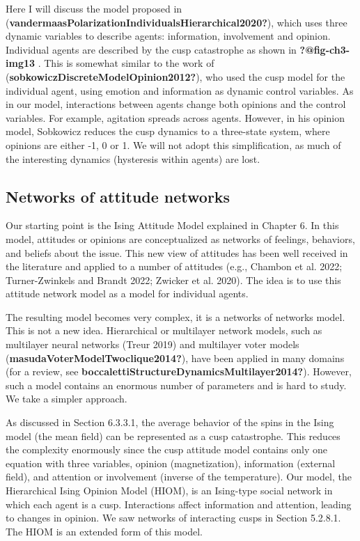 \documentclass[
  letterpaper,
]{scrbook}
\begin{document}
Here I will discuss the model proposed in
(\textbf{vandermaasPolarizationIndividualsHierarchical2020?}), which
uses three dynamic variables to describe agents: information,
involvement and opinion. Individual agents are described by the cusp
catastrophe as shown in \textbf{?@fig-ch3-img13} . This is somewhat
similar to the work of (\textbf{sobkowiczDiscreteModelOpinion2012?}),
who used the cusp model for the individual agent, using emotion and
information as dynamic control variables. As in our model, interactions
between agents change both opinions and the control variables. For
example, agitation spreads across agents. However, in his opinion model,
Sobkowicz reduces the cusp dynamics to a three-state system, where
opinions are either -1, 0 or 1. We will not adopt this simplification,
as much of the interesting dynamics (hysteresis within agents) are lost.

\hypertarget{networks-of-attitude-networks}{%
\subsection{Networks of attitude
networks}\label{networks-of-attitude-networks}}

Our starting point is the Ising Attitude Model explained in Chapter 6.
In this model, attitudes or opinions are conceptualized as networks of
feelings, behaviors, and beliefs about the issue. This new view of
attitudes has been well received in the literature and applied to a
number of attitudes (e.g., Chambon et al. 2022; Turner-Zwinkels and
Brandt 2022; Zwicker et al. 2020). The idea is to use this attitude
network model as a model for individual agents.

The resulting model becomes very complex, it is a networks of networks
model. This is not a new idea. Hierarchical or multilayer network
models, such as multilayer neural networks (Treur 2019) and multilayer
voter models (\textbf{masudaVoterModelTwoclique2014?}), have been
applied in many domains (for a review, see
\textbf{boccalettiStructureDynamicsMultilayer2014?}). However, such a
model contains an enormous number of parameters and is hard to study. We
take a simpler approach.

As discussed in Section 6.3.3.1, the average behavior of the spins in
the Ising model (the mean field) can be represented as a cusp
catastrophe. This reduces the complexity enormously since the cusp
attitude model contains only one equation with three variables, opinion
(magnetization), information (external field), and attention or
involvement (inverse of the temperature). Our model, the Hierarchical
Ising Opinion Model (HIOM), is an Ising-type social network in which
each agent is a cusp. Interactions affect information and attention,
leading to changes in opinion. We saw networks of interacting cusps in
Section 5.2.8.1. The HIOM is an extended form of this model.
\end{document}
